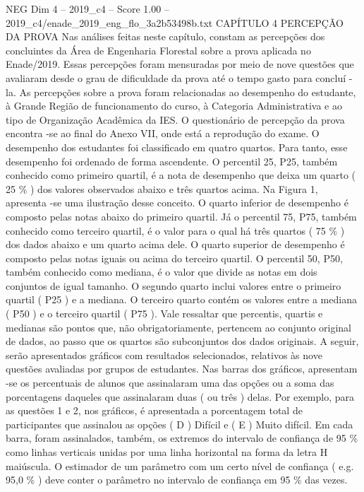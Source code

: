 \begin{textsample}{NEG Dim 4 – 2019\_c4 – Score 1.00 – 2019\_c4/enade\_2019\_eng\_flo\_3a2b53498b.txt}  \label{ex:f4_neg_242}
CAPÍTULO 4 PERCEPÇÃO DA PROVA Nas análises feitas neste capítulo, constam as percepções dos concluintes da Área de Engenharia Florestal sobre a prova aplicada no Enade/2019.
Essas percepções foram mensuradas por meio de nove questões que avaliaram desde o grau de dificuldade da prova até o tempo gasto para concluí -la.
As percepções sobre a prova foram relacionadas ao desempenho do estudante, à Grande Região de funcionamento do curso, à Categoria Administrativa e ao tipo de Organização Acadêmica da IES.
O questionário de percepção da prova encontra -se ao final do Anexo VII, onde está a reprodução do exame.
O desempenho dos estudantes foi classificado em quatro quartos.
Para tanto, esse desempenho foi ordenado de forma ascendente.
O percentil 25, P25, também conhecido como primeiro quartil, é a nota de desempenho que deixa um quarto ( 25 \% ) dos valores observados abaixo e três quartos acima.
Na Figura 1, apresenta -se uma ilustração desse conceito.
O quarto inferior de desempenho é composto pelas notas abaixo do primeiro quartil.
Já o percentil 75, P75, também conhecido como terceiro quartil, é o valor para o qual há três quartos ( 75 \% ) dos dados abaixo e um quarto acima dele.
O quarto superior de desempenho é composto pelas notas iguais ou acima do terceiro quartil.
O percentil 50, P50, também conhecido como mediana, é o valor que divide as notas em dois conjuntos de igual tamanho.
O segundo quarto inclui valores entre o primeiro quartil ( P25 ) e a mediana.
O terceiro quarto contém os valores entre a mediana ( P50 ) e o terceiro quartil ( P75 ).
Vale ressaltar que percentis, quartis e medianas são pontos que, não obrigatoriamente, pertencem ao conjunto original de dados, ao passo que os quartos são subconjuntos dos dados originais.
A seguir, serão apresentados gráficos com resultados selecionados, relativos às nove questões avaliadas por grupos de estudantes.
Nas barras dos gráficos, apresentam -se os percentuais de alunos que assinalaram uma das opções ou a soma das porcentagens daqueles que assinalaram duas ( ou três ) delas.
Por exemplo, para as questões 1 e 2, nos gráficos, é apresentada a porcentagem total de participantes que assinalou as opções ( D ) Difícil e ( E ) Muito difícil.
Em cada barra, foram assinalados, também, os extremos do intervalo de confiança de 95 \% como linhas verticais unidas por uma linha horizontal na forma da letra H maiúscula.
O estimador de um parâmetro com um certo nível de confiança ( e.g. 95,0 \% ) deve conter o parâmetro no intervalo de confiança em 95 \% das vezes.

\end{textsample}
